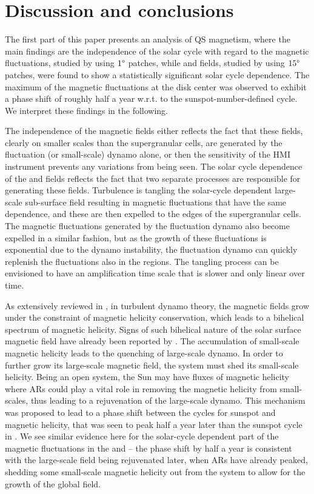 \documentclass{aa}
\begin{document}
\section{Discussion and conclusions}

The first part of this paper presents an analysis of QS magnetism, where the main findings are the independence of the solar cycle  with regard to the \IN{} magnetic fluctuations, studied by using $1\degree$ patches, while \NW{} and \IN{} fields, studied by using $15 \degree$ patches, were found to show a statistically significant solar cycle dependence. The maximum of the magnetic fluctuations at the disk center was observed to exhibit a phase shift of roughly half a year w.r.t. to the sunspot-number-defined cycle. We interpret these findings in the following. 

The independence of the \IN{} magnetic fields either reflects the fact that these fields, clearly on smaller scales than the supergranular cells, are generated by the fluctuation (or small-scale) dynamo alone, or then the sensitivity of the HMI instrument prevents  any variations from 
being
seen. The solar cycle dependence of the \NW{} and \IN{} fields reflects the fact that two separate processes are responsible for generating these fields. Turbulence is tangling the solar-cycle dependent large-scale sub-surface field resulting in magnetic fluctuations that have the same dependence, and these are then expelled to the edges of the supergranular cells. The magnetic fluctuations generated by the fluctuation dynamo also become expelled in a similar fashion, but as the growth of these fluctuations is exponential due to the dynamo instability, the fluctuation dynamo can quickly replenish the fluctuations also in the \IN{} regions. The tangling process can be envisioned to have an amplification time scale that is slower and only linear over time.

As extensively reviewed in \cite{BS05}, in turbulent dynamo theory, the magnetic fields grow under the constraint of magnetic helicity
conservation, which leads to a bihelical spectrum of magnetic helicity. Signs of such bihelical nature of the solar surface magnetic field have already been reported by \citet{B+17,S+18}. The accumulation of small-scale
magnetic helicity leads to the quenching of large-scale dynamo. In order to further grow its large-scale
magnetic field, the system must shed its small-scale helicity. Being an open system, the Sun
may have fluxes of magnetic helicity where ARs could play a vital role in removing the magnetic
helicity from small-scales, thus leading to a rejuvenation of
the
large-scale dynamo. This mechanism was proposed to lead to a phase shift 
between the cycles for sunspot and magnetic helicity,
that was seen to peak half a year later than the sunspot cycle in \cite{S+18}. We see similar evidence here for the solar-cycle dependent part of the magnetic fluctuations in the \NW{} and \IN{} -- the phase shift by half a year is consistent with the large-scale field being rejuvenated later, when ARs have already peaked, shedding some small-scale magnetic helicity out from the system to allow for the growth of the global field.
\end{document}
